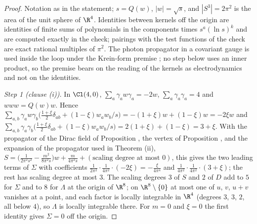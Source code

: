 \begin{proof}
Notation as in the statement; $s = Q(w)$, $|w| = \sqrt{s}$, and $|S^{3}| = 2\pi^{2}$ is the area of the unit sphere of $\R^{4}$. Identities between kernels off the origin are identities of finite sums of polynomials in the components times $s^{a}(\ln s)^{k}$ and are computed exactly in the check; pairings with the test functions of the check are exact rational multiples of $\pi^{2}$. The photon propagator in a covariant gauge is used inside the loop under the Krein-form premise ; no step below uses an inner product, so the premise bears on the reading of the kernels as electrodynamics and not on the identities.

\emph{Step 1 (clause (i)).} In $\Cl(4,0)$, $\sum_{a}\gamma_{a}w\gamma_{a} = -2w$, $\sum_{a}\gamma_{a}\gamma_{a} = 4$ and $www = Q(w)w$. Hence $\sum_{a,b}\gamma_{a}w\gamma_{b}\big(\tfrac{1+\xi}{2}\delta_{ab} + (1-\xi)w_{a}w_{b}/s\big) = -(1+\xi)w + (1-\xi)w = -2\xi w$ and $\sum_{a,b}\gamma_{a}\gamma_{b}\big(\tfrac{1+\xi}{2}\delta_{ab} + (1-\xi)w_{a}w_{b}/s\big) = 2(1+\xi) + (1-\xi) = 3+\xi$. With the propagator of the Dirac field of Proposition , the vertex of Proposition , and the expansion of the propagator used in Theorem (ii), $S = \big(\frac{1}{2\pi^{2}s^{2}} - \frac{m^{2}}{8\pi^{2}s}\big)w + \frac{m}{4\pi^{2}s} + (\text{scaling degree at most } 0)$, this gives the two leading terms of $\Sigma$ with coefficients $\frac{1}{2\pi^{2}}\cdot\frac{1}{4\pi^{2}}\cdot(-2\xi) = -\frac{\xi}{4\pi^{4}}$ and $\frac{1}{4\pi^{2}}\cdot\frac{1}{4\pi^{2}}\cdot(3+\xi)$; the rest has scaling degree at most $3$. The scaling degrees $3$ of $S$ and $2$ of $D$ add to $5$ for $\Sigma$ and to $8$ for $\Lambda$ at the origin of $\R^{8}$; on $\R^{8}\setminus\{0\}$ at most one of $u$, $v$, $u+v$ vanishes at a point, and each factor is locally integrable in $\R^{4}$ (degrees $3$, $3$, $2$, all below $4$), so $\Lambda$ is locally integrable there. For $m = 0$ and $\xi = 0$ the first identity gives $\Sigma = 0$ off the origin.


\end{proof}
